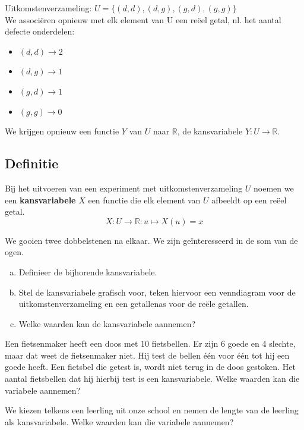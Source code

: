 \documentclass[a4paper,12pt, twoside]{article}
\begin{document}
Uitkomstenverzameling: $U=\{(d,d), (d,g), (g,d), (g,g)\}$\\
We associëren opnieuw met elk element van U een reëel getal, nl. het aantal defecte onderdelen:
\begin{itemize}
  \item $(d,d) \to 2$
  \item $(d,g) \to 1$
  \item $(g,d) \to 1$
  \item $(g,g) \to 0$
\end{itemize}
We krijgen opnieuw een functie $Y$ van $U$ naar $\mathbb{R}$, de kansvariabele $Y:U\to\mathbb{R}$.

\needspace{4cm}
\subsection{Definitie}

\begin{mdframed}
Bij het uitvoeren van een experiment met uitkomstenverzameling $U$ noemen we een {\bf kansvariabele} $X$ een functie die elk element van $U$ afbeeldt op een reëel getal.
$$X:U\to\mathbb{R}:u\mapsto X(u)=x$$
\end{mdframed}

\begin{oefening}
We gooien twee dobbelstenen na elkaar. We zijn geïnteresseerd in de som van de ogen.
\begin{enumerate}[(a)]
  \item Definieer de bijhorende kansvariabele.
  \item Stel de kansvariabele grafisch voor, teken hiervoor een venndiagram voor de uitkomstenverzameling en een getallenas voor de reële getallen.
  \item Welke waarden kan de kansvariabele aannemen?
\end{enumerate}
\end{oefening}

\begin{oefening}
Een fietsenmaker heeft een doos met 10 fietsbellen. Er zijn 6 goede en 4 slechte, maar dat weet de fietsenmaker niet. Hij test de bellen één voor één tot hij een goede heeft. Een fietsbel die getest is, wordt niet terug in de doos gestoken. Het aantal fietsbellen dat hij hierbij test is een kansvariabele.
Welke waarden kan die variabele aannemen?
\end{oefening}

\begin{oefening}
We kiezen telkens een leerling uit onze school en nemen de lengte van de leerling als kansvariabele. Welke waarden kan die variabele aannemen?
\end{oefening}
\end{document}
